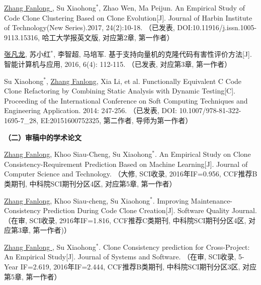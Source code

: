 \begin{publist}
\item
\underline{Zhang Fanlong }, Su Xiaohong{$^*$},  Zhao Wen,  Ma Peijun. An Empirical Study of Code Clone Clustering Based on Clone Evolution[J]. Journal of Harbin Institute of Technology(New Series).2017, 24(2):10-18.
（已发表, DOI:10.11916/j.issn.1005-9113.15316, 哈工大学报英文版, 对应第2章, 第一作者）

\item
\underline{张凡龙}, 苏小红{$^*$},  李智超,  马培军. 基于支持向量机的克隆代码有害性评价方法[J]. 智能计算机与应用, 2016, 6(4): 112-115. 
（已发表, 对应第3章, 第一作者）

\item
Su Xiaohong{$^*$}, \underline{Zhang Fanlong},  Xia Li, et al. Functionally Equivalent C Code Clone Refactoring by Combining Static Analysis with Dynamic Testing[C]. Proceeding of the International Conference on Soft Computing Techniques and Engineering Application. 2014: 247-256.
（已发表, DOI: 10.1007/978-81-322-1695-7\_28, EI:20151600752325, 第二作者, 导师为第一作者）
\end{publist}

\noindent\textbf{（二）审稿中的学术论文}
\begin{publist}

\item
\underline{Zhang Fanlong},  Khoo Siau-Cheng, Su Xiaohong{$^*$}. An Empirical Study on Clone Consistency-Requirement Prediction Based on Machine Learning[J]. Journal of Computer Science and Technology.
（大修, SCI收录, 2016年IF=0.956, CCF推荐B类期刊, 中科院SCI期刊分区4区, 对应第5章, 第一作者）

\item
\underline{Zhang Fanlong}, Khoo Siau-cheng, Su Xiaohong{$^*$}. Improving Maintenance-Consistency Prediction During Code Clone Creation[J]. Software Quality Journal. 
（在审, SCI收录, 2916年IF=1.816, CCF推荐C类期刊, 中科院SCI期刊分区4区, 对应第3章, 第一作者)）

\item
\underline{Zhang Fanlong }, Su Xiaohong{$^*$}. Clone Consistency prediction for Cross-Project: An Empirical Study[J]. Journal of Systems and Software.
（在审, SCI收录, 5-Year IF=2.619, 2016年IF=2.444, CCF推荐B类期刊, 中科院SCI期刊分区3区, 对应第5章, 第一作者）



\end{publist}

